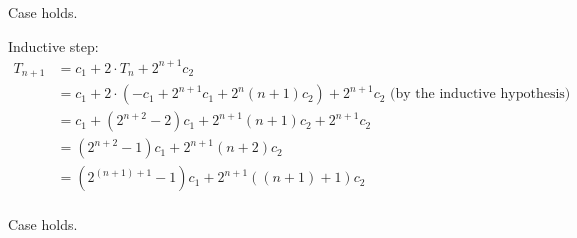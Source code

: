 \documentclass[12pt, letterpaper, twoside]{article}
\begin{document}
Case holds.

Inductive step:
\begin{equation} \label{eq7}
    \begin{split}
    T_{n+1} & = c_1 + 2 \cdot T_{n} + 2^{n+1} c_2 \\
    & = c_1 + 2 \cdot (-c_1 + 2^{n+1} c_1 + 2^n (n+1) c_2) + 2^{n+1} c_2 \text{ (by the inductive hypothesis)} \\
    & = c_1 + (2^{n+2} -2) c_1 + 2^{n+1} (n+1) c_2 + 2^{n+1} c_2  \\
    & = (2^{n+2} -1) c_1 + 2^{n+1} (n+2) c_2  \\
    & = (2^{(n+1)+1} -1) c_1 + 2^{n+1} ((n+1)+1) c_2  \\
\end{split}
\end{equation}

Case holds.
\end{document}
